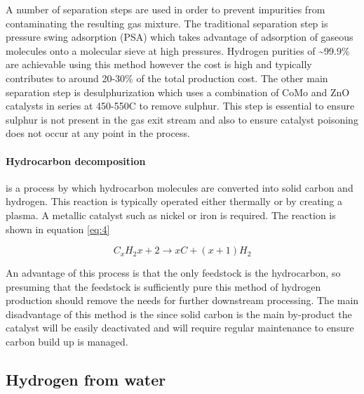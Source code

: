 A number of separation steps are used in order to prevent impurities from contaminating the 
resulting gas mixture. The traditional separation step is pressure swing adsorption (PSA) which takes 
advantage of adsorption of gaseous molecules onto a molecular sieve at high pressures. Hydrogen purities of \textasciitilde99.9\% are achievable using this method however the cost is high and typically contributes to around 
20-30\% of the total production cost. \cite{Muradov2015} The other main separation step is desulphurization which uses a 
combination of CoMo and ZnO catalysts in series at 450-550\textdegree C to remove sulphur. \cite{Muradov2015}
This step is essential to ensure sulphur is not present in the gas exit stream and also to ensure catalyst 
poisoning does not occur at any point in the process. 

\paragraph{Hydrocarbon decomposition} is a process by which hydrocarbon molecules are converted into solid carbon and hydrogen. \cite{Ahmed2009} This reaction is typically operated either thermally or by creating a plasma. A metallic catalyst such as nickel or iron is required. The reaction is shown in equation \ref{eq:4} \cite{Muradov2008} 

\begin{equation}\label{eq:4}
    C_x H_2x+2 \rightarrow xC + (x+1)H_2
\end{equation}

An advantage of this process is that the only feedstock is the hydrocarbon, so presuming that the feedstock is sufficiently pure this method of hydrogen production should remove the needs for further downstream processing. \cite{Ahmed2009} The main disadvantage of this method is the since solid carbon is the main by-product the catalyst will be easily deactivated and will require regular maintenance to ensure carbon build up is managed. \cite{Ahmed2009}

\subsection{Hydrogen from water}

